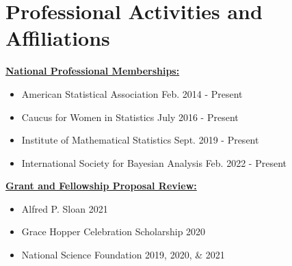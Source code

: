 \documentclass[11pt, letterpaper, roman]{moderncv} %
\newcommand{\professionalspace}{\vspace{8pt}}
\begin{document}

\section{Professional Activities and Affiliations}

\underline{\textbf{\large National Professional Memberships:}}\normalsize
\begin{itemize}
    \item American Statistical Association \hfill Feb. 2014 - Present
    \item Caucus for Women in Statistics \hfill July 2016 - Present
    \item Institute of Mathematical Statistics \hfill Sept. 2019 - Present
    \item International Society for Bayesian Analysis \hfill Feb. 2022 - Present
\end{itemize}

\professionalspace
\underline{\textbf{\large Grant and Fellowship Proposal Review:}}\normalsize

\begin{itemize}
    \item Alfred P. Sloan \hfill 2021
    \item Grace Hopper Celebration Scholarship \hfill 2020
    \item National Science Foundation \hfill 2019, 2020, \& 2021
\end{itemize}
\end{document}
